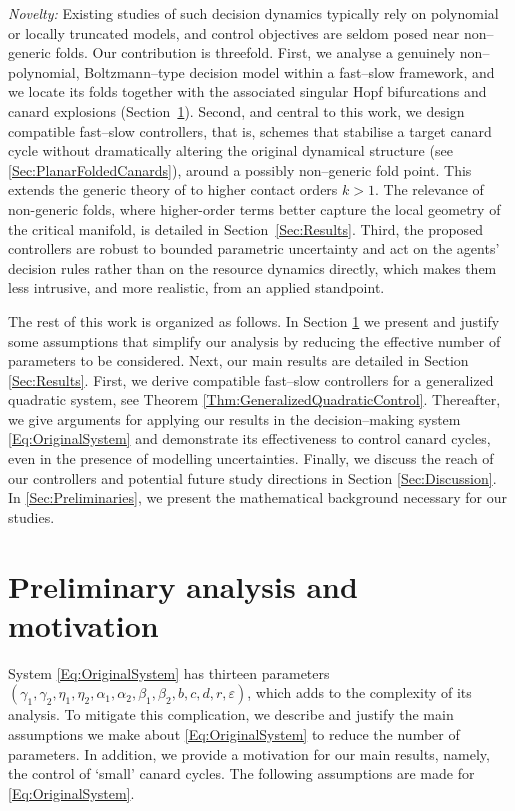 \documentclass[3p]{elsarticle}
\theoremstyle{plain}
\theoremstyle{remark}
\theoremstyle{definition}
\begin{document}
    \emph{Novelty:} Existing studies of such decision dynamics
typically rely on polynomial or locally truncated models, and control objectives
are seldom posed near non--generic folds. Our contribution is threefold. First, we
analyse a genuinely non--polynomial, Boltzmann--type decision model within a
fast--slow framework, and we locate its folds together with the associated singular
Hopf bifurcations and canard explosions (Section~\ref{Sec:Assumptions}). Second,
and central to this work, we design compatible fast--slow controllers, that is,
schemes that stabilise a target canard cycle without dramatically altering the
original dynamical structure (see \ref{Sec:PlanarFoldedCanards}), around a possibly
non--generic fold point. This extends the generic theory of
\cite{Ref:JardonKojakhmetov2022} to higher contact orders $k>1$. The relevance of non-generic folds, where higher-order terms better capture the local geometry of the critical manifold, is detailed in Section~\ref{Sec:Results}. Third, the
proposed controllers are robust to bounded parametric uncertainty and act on the
agents' decision rules rather than on the resource dynamics directly, which makes
them less intrusive, and more realistic, from an applied standpoint.
    
    
    The rest of this work is organized as follows. In Section \ref{Sec:Assumptions} we present and justify some assumptions that simplify our analysis by reducing the effective number of parameters to be considered. Next, our main results are detailed in Section \ref{Sec:Results}. First, we derive compatible fast--slow controllers for a generalized quadratic system, see Theorem \ref{Thm:GeneralizedQuadraticControl}. Thereafter, we give arguments for applying our results in the decision--making system \eqref{Eq:OriginalSystem} and demonstrate its effectiveness to control canard cycles, even in the presence of modelling uncertainties. Finally, we discuss the reach of our controllers and potential future study directions in Section \ref{Sec:Discussion}. In \ref{Sec:Preliminaries}, we present the mathematical background necessary for our studies.



\section{Preliminary analysis and motivation}\label{Sec:Assumptions}
System \eqref{Eq:OriginalSystem} has thirteen parameters $(\gamma_1,\gamma_2,\eta_1,\eta_2,\alpha_1,\alpha_2,\beta_1,\beta_2,b,c,d,r,\varepsilon)$, which adds to the complexity of its analysis. To mitigate this complication, we describe and justify the main assumptions we make about \eqref{Eq:OriginalSystem} to reduce the number of parameters. In addition, we provide a motivation for our main results, namely, the control of `small' canard cycles.
The following assumptions are made for \eqref{Eq:OriginalSystem}. 
\end{document}
